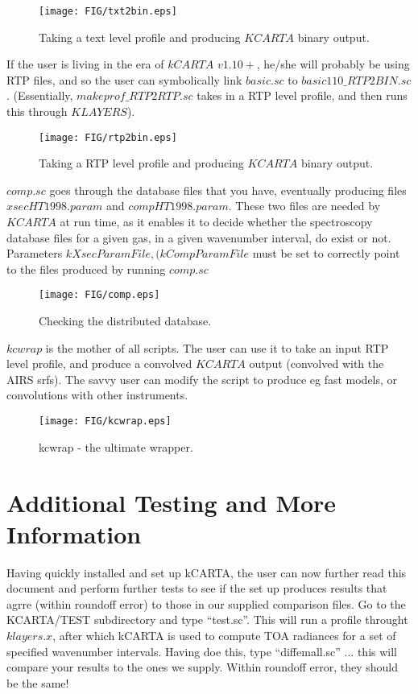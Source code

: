 \documentclass[11pt]{article}
\newcommand{\kc}{\textsf{kCARTA}\xspace}
\begin{document}
\begin{figure}
\texttt{[image: FIG/txt2bin.eps]}
\caption{Taking a text level profile and producing $KCARTA$ binary output.}
\end{figure}

If the user is living in the era of $kCARTA$ $v1.10+$, he/she will probably 
be using RTP files, and so the user can symbolically link $basic.sc$ to 
$basic110\_RTP2BIN.sc$. (Essentially, $makeprof\_RTP2RTP.sc$ takes in a RTP
level profile, and then runs this through $KLAYERS$).

\begin{figure}
\texttt{[image: FIG/rtp2bin.eps]}
\caption{Taking a RTP level profile and producing $KCARTA$ binary output.}
\end{figure}

$comp.sc$ goes through the database files that you have, eventually producing
files $xsecHT1998.param$ and $compHT1998.param$. These two files are needed by
$KCARTA$ at run time, as it enables it to decide whether the spectroscopy 
database files for a given gas, in a given wavenumber interval, do exist or
not. Parameters $kXsecParamFile, (kCompParamFile$ must be set to correctly
point to the files produced by running $comp.sc$

\begin{figure}
\texttt{[image: FIG/comp.eps]}
\caption{Checking the distributed database.}
\end{figure}

$kcwrap$ is the mother of all scripts. The user can use it to take an input
RTP level profile, and produce a convolved $KCARTA$ output (convolved with the
AIRS srfs). The savvy user can modify the script to produce eg fast models, 
or convolutions with other instruments.

\begin{figure}
\texttt{[image: FIG/kcwrap.eps]}
\caption{kcwrap - the ultimate wrapper.}
\end{figure}

\section{Additional Testing and More Information}

Having quickly installed and set up \kc, the user can now further read this
document and perform further tests to see if the set up produces results that
agrre (within roundoff error) to those in our supplied comparison files. 
Go to the KCARTA/TEST subdirectory and type ``test.sc''. This will run a 
profile throught $klayers.x$, after which \kc is used to compute TOA radiances
for a set of specified wavenumber intervals. Having doe this, type 
``diffemall.sc'' ... this will compare your results to the ones we supply. 
Within roundoff error, they should be the same!
\end{document}
